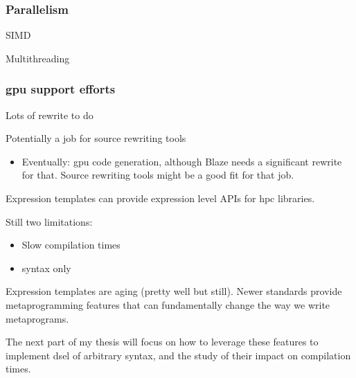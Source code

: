 \documentclass[../main]{subfiles}
\begin{document}
\subsubsection{
  Parallelism
}

SIMD

Multithreading

\subsubsection{
  \acrlong{gpu} support efforts
}

Lots of rewrite to do

Potentially a job for source rewriting tools

\begin{itemize}
\item Eventually: \gls{gpu} code generation, although Blaze needs a significant
      rewrite for that. Source rewriting tools might be a good fit for that job.
\end{itemize}

Expression templates can provide expression level APIs for \gls{hpc} libraries.

Still two limitations:

\begin{itemize}
\item Slow compilation times
\item \cpp syntax only
\end{itemize}

Expression templates are aging (pretty well but still).
Newer \cpp standards provide metaprogramming features that can fundamentally
change the way we write metaprograms.

The next part of my thesis will focus on how to leverage these features to
implement \gls{dsel} of arbitrary syntax, and the study of their impact on
compilation times.
\end{document}
